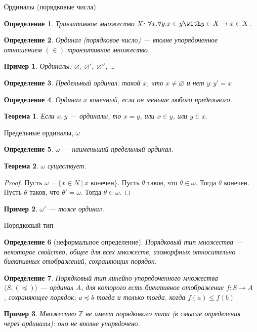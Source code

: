 \documentclass[aspectratio=169]{beamer}
\newtheorem{thm}{Теорема}[section]
\newtheorem{dfn}{Определение}[section]
\newtheorem{exm}{Пример}[section]
\begin{document}
\begin{frame}{Ординалы (порядковые числа)}
\begin{dfn}Транзитивное множество $X$: $\forall x.\forall y.x \in y \with y \in X \rightarrow x \in X$.\end{dfn}\pause
\begin{dfn}Ординал (порядковое число) --- вполне упорядоченное отношением $(\in)$ транзитивное множество.\end{dfn}\pause
\begin{exm}Ординалы: $\varnothing$, \pause $\varnothing'$, \pause $\varnothing''$, \dots\end{exm}\pause
\begin{dfn}Предельный ординал: такой $x$, что $x \ne \varnothing$ и нет $y: y' = x$\end{dfn}\pause
\begin{dfn}Ординал $x$ конечный, если он меньше любого предельного.\end{dfn}\pause
\begin{thm}Если $x,y$ --- ординалы, то $x = y$, или $x\in y$, или $y \in x$.\end{thm}
\end{frame}
\begin{frame}{Предельные ординалы, $\omega$}
\begin{dfn}$\omega$ --- наименьший предельный ординал.\end{dfn}\pause
\begin{thm}$\omega$ существует.\end{thm}\pause
\begin{proof}Пусть $\omega = \{ x \in N\ |\ x\text{ конечен}\}$. 
Пусть $\theta$ таков, что $\theta \in \omega$. Тогда $\theta$ конечен. \pause
Пусть $\theta$ таков, что $\theta' = \omega$. Тогда $\theta \in \omega$.\end{proof}
\begin{exm}$\omega'$ --- тоже ординал.\end{exm}
\end{frame}

\begin{frame}{Порядковый тип}
\begin{dfn}[неформальное определение]Порядковый тип множества --- некоторое свойство, общее для всех множеств, 
изоморфных относительно биективных отображений, сохраняющих порядок.\end{dfn}

\begin{dfn}Порядковый тип линейно-упорядоченного множества $\langle S, (\preceq)\rangle$ --- ординал $A$, для которого есть биективное отображение $f: S \rightarrow A$, сохраняющее порядок:
$a \preceq b$ тогда и только тогда, когда $f(a) \le f(b)$\end{dfn}

\begin{exm}Множество $\mathbb{Z}$ не имеет порядкового типа (в смысле определения через ординалы): оно не вполне упорядочено.\end{exm}
\end{frame}
\end{document}
